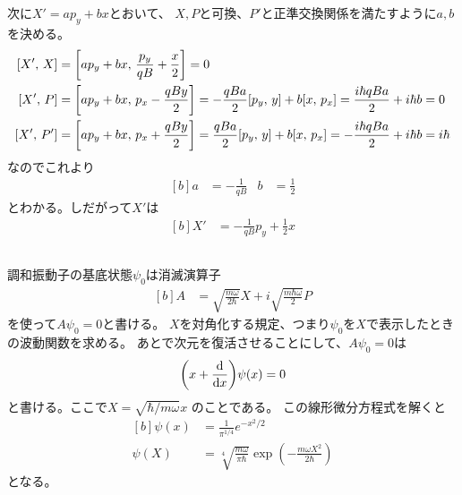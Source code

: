 \documentclass[../../sp_2013.tex]{subfiles}
\begin{document}
次に\(X' = ap_y+bx\)とおいて、
\(X,P\)と可換、\(P'\)と正準交換関係を満たすように\(a,b\)を決める。
\begin{equation}\begin{aligned}[b]
    [X',\,X] &= \qty[ap_y+bx,\,\frac{p_y}{qB}+\frac{x}{2}]
    =0\\
    [X',\,P] &= \qty[ap_y+bx,\,p_x-\frac{qBy}{2}] = -\frac{qBa}{2}[p_y,\,y]+b[x,\,p_x] = \frac{i\hbar qBa}{2} + i\hbar b  = 0\\
    [X',\,P'] &= \qty[ap_y+bx,\,p_x+\frac{qBy}{2}] = \frac{qBa}{2}[p_y,\,y]+b[x,\,p_x] = - \frac{i\hbar qBa}{2} + i\hbar b = i\hbar\\
\end{aligned}\end{equation}
なのでこれより
\begin{equation}\begin{aligned}[b]
    a &=  -\frac{1}{qB} & b&= \frac{1}{2}
\end{aligned}\end{equation}
とわかる。しだがって\(X'\)は
\begin{equation}\begin{aligned}[b]
    X' &= -\frac{1}{qB}p_y + \frac{1}{2}x
\end{aligned}\end{equation}

\subsection{}
調和振動子の基底状態\(\psi_0\)は消滅演算子
\begin{equation}\begin{aligned}[b]
    A &= \sqrt{\frac{m\omega}{2\hbar}}X + i\sqrt{\frac{m\hbar\omega}{2}}P
\end{aligned}\end{equation}
を使って\(A\psi_0 = 0\)と書ける。
\(X\)を対角化する規定、つまり\(\psi_0\)を\(X\)で表示したときの波動関数を求める。
あとで次元を復活させることにして、\(A\psi_0 = 0\)は
\begin{equation}\begin{aligned}[b]
    \qty(x+\dv{x})\psi(x) = 0
\end{aligned}\end{equation}
と書ける。ここで\(X = \sqrt{\hbar/m\omega} x\) のことである。
この線形微分方程式を解くと
\begin{equation}\begin{aligned}[b]
    \psi(x) &= \frac{1}{\pi^{1/4}}e^{-x^2/2}\\
    \psi(X) &= \sqrt[4]{\frac{m\omega}{\pi \hbar}} \exp(-\frac{m\omega X^2}{2\hbar})
\end{aligned}\end{equation}
となる。
\end{document}
